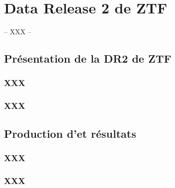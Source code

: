 \documentclass[../main/main.tex]{subfiles}
\begin{document}
\chapter{Data Release 2 de ZTF}\label{ch:res}

-- XXX --

\minitoc
\newpage

\section{Présentation de la DR2 de ZTF}

\subsection{XXX}

\subsection{XXX}


\section{Production d'\hypergal et résultats}

\subsection{XXX}

\subsection{XXX}
\end{document}
